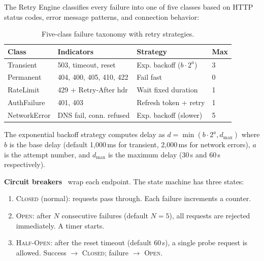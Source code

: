 \documentclass[10pt, twocolumn]{article}
\begin{document}
The Retry Engine classifies every failure into one of five classes based on HTTP status codes, error message patterns, and connection behavior:

\begin{table}[h]
\caption{Five-class failure taxonomy with retry strategies.}
\label{tab:retry}
\centering
\scriptsize
\begin{tabular}{@{}llll@{}}
\toprule
\textbf{Class} & \textbf{Indicators} & \textbf{Strategy} & \textbf{Max} \\
\midrule
Transient & 503, timeout, reset & Exp. backoff ($b \cdot 2^a$) & 3 \\
Permanent & 404, 400, 405, 410, 422 & Fail fast & 0 \\
RateLimit & 429 + Retry-After hdr & Wait fixed duration & 1 \\
AuthFailure & 401, 403 & Refresh token + retry & 1 \\
NetworkError & DNS fail, conn. refused & Exp. backoff (slower) & 5 \\
\bottomrule
\end{tabular}
\end{table}

The exponential backoff strategy computes delay as $d = \min(b \cdot 2^a, d_{\max})$ where $b$ is the base delay (default 1{,}000\,ms for transient, 2{,}000\,ms for network errors), $a$ is the attempt number, and $d_{\max}$ is the maximum delay (30\,s and 60\,s respectively).

\textbf{Circuit breakers}~\cite{nygard2018release} wrap each endpoint. The state machine has three states:

\begin{enumerate}[nosep, leftmargin=*]
\item \textsc{Closed} (normal): requests pass through. Each failure increments a counter.
\item \textsc{Open}: after $N$ consecutive failures (default $N{=}5$), all requests are rejected immediately. A timer starts.
\item \textsc{Half-Open}: after the reset timeout (default 60\,s), a single probe request is allowed. Success $\to$ \textsc{Closed}; failure $\to$ \textsc{Open}.
\end{enumerate}
\end{document}
